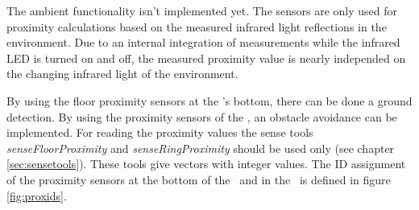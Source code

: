 The ambient functionality isn't implemented yet. The sensors are only used for proximity calculations based on the measured infrared light reflections in the environment. Due to an internal integration of measurements while the infrared LED is turned on and off, the measured proximity value is nearly independed on the changing infrared light of the environment.

By using the floor proximity sensors at the \amiro's bottom, there can be done a ground detection. By using the proximity sensors of the \proxring, an obstacle avoidance can be implemented. For reading the proximity values the sense tools {\it senseFloorProximity} and {\it senseRingProximity} should be used only (see chapter \ref{sec:sensetools}). These tools give vectors with integer values. The ID assignment of the proximity sensors at the bottom of the \diwheel\ and in the \proxring\ is defined in figure \ref{fig:proxids}.

